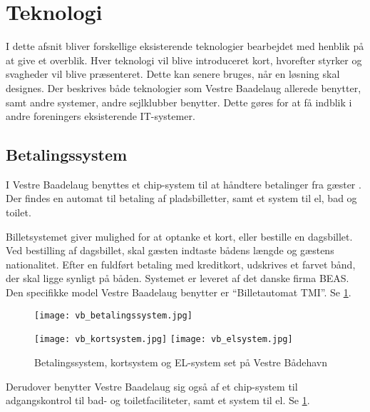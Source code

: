 \section{Teknologi} %
\label{sec:Teknologi}

I dette afsnit bliver forskellige eksisterende teknologier bearbejdet med henblik på at give et overblik. Hver teknologi vil blive introduceret kort, hvorefter styrker og svagheder vil blive præsenteret. Dette kan senere bruges, når en løsning skal designes. Der beskrives både teknologier som Vestre Baadelaug allerede benytter, samt andre systemer, andre sejlklubber benytter. Dette gøres for at få indblik i andre foreningers eksisterende IT-systemer. 

\subsection{Betalingssystem} %
\label{sub:tek_betaling}

I Vestre Baadelaug benyttes et chip-system til at håndtere betalinger fra gæster \cite{int_hf}. Der findes en automat til betaling af pladsbilletter, samt et system til el, bad og toilet.

Billetsystemet giver mulighed for at optanke et kort, eller bestille en dagsbillet. Ved bestilling af dagsbillet, skal gæsten indtaste bådens længde og gæstens nationalitet. Efter en fuldført betaling med kreditkort, udskrives et farvet bånd, der skal ligge synligt på båden. Systemet er leveret af det danske firma BEAS. Den specifikke model Vestre Baadelaug benytter er \enquote{Billetautomat TMI}. Se \cref{fig:vb_systemer}.

\begin{figure}[h]
  \centering
  \begin{minipage}{0.45\textwidth}
    \texttt{[image: vb\_betalingssystem.jpg]}
  \end{minipage}
  \begin{minipage}{0.45\textwidth}
    \texttt{[image: vb\_kortsystem.jpg]}
    \texttt{[image: vb\_elsystem.jpg]}
  \end{minipage}
    \caption{Betalingssystem, kortsystem og EL-system set på Vestre Bådehavn}
    \label{fig:vb_systemer}
\end{figure}

Derudover benytter Vestre Baadelaug sig også af et chip-system til adgangskontrol til bad- og toiletfaciliteter, samt et system til el. Se \cref{fig:vb_systemer}.

